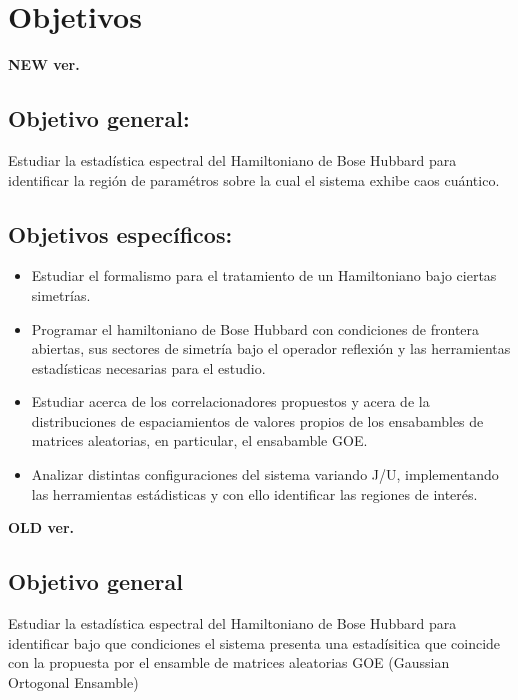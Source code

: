 \documentclass[spanish,titlepage,table]{practicas}
\begin{document}
\section{Objetivos}\label{sec:objetivos}
\textbf{NEW ver.}
 \subsection{Objetivo general:}
 Estudiar la estadística espectral del Hamiltoniano de Bose Hubbard para identificar la región de paramétros sobre la cual 
 el sistema exhibe caos cuántico.
 \subsection{Objetivos específicos:}
 \begin{itemize}
    \item Estudiar el formalismo para el tratamiento de un Hamiltoniano bajo ciertas simetrías.
    \item Programar el hamiltoniano de Bose Hubbard con condiciones de frontera abiertas, sus sectores de simetría bajo el operador reflexión y las herramientas estadísticas necesarias para el estudio.
    \item Estudiar acerca de los correlacionadores propuestos y acera de la distribuciones de espaciamientos de valores propios de los ensabambles de matrices aleatorias, en particular, el ensabamble GOE.
    \item Analizar distintas configuraciones del sistema variando J/U, implementando las herramientas estádisticas y con ello identificar las regiones de interés.
 \end{itemize}
\textbf{OLD ver.}
\subsection{Objetivo general}
Estudiar la estadística espectral del Hamiltoniano de Bose Hubbard para identificar bajo que condiciones 
el sistema presenta una estadísitica  que coincide con la propuesta por el ensamble de matrices aleatorias GOE (Gaussian Ortogonal Ensamble)
\end{document}
